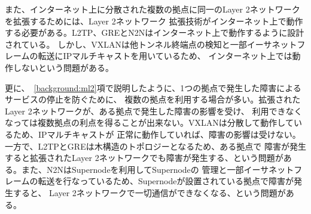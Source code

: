 また、インターネット上に分散された複数の拠点に同一のLayer 2ネットワークを拡張するためには、Layer 2ネットワーク
拡張技術がインターネット上で動作する必要がある。L2TP、GREとN2Nはインターネット上で動作するように設計されている。
しかし、VXLANは他トンネル終端点の検知と一部イーサネットフレームの転送にIPマルチキャストを用いているため、
インターネット上では動作しないという問題がある。

更に、~\ref{background:ml2}項で説明したように、1つの拠点で発生した障害によるサービスの停止を防ぐために、
複数の拠点を利用する場合が多い。拡張されたLayer 2ネットワークが、ある拠点で発生した障害の影響を受け、
利用できなくなっては複数拠点の利点を得ることが出来ない。VXLANは分散して動作しているため、IPマルチキャストが
正常に動作していれば、障害の影響は受けない。一方で、L2TPとGREは木構造のトポロジーとなるため、ある拠点で
障害が発生すると拡張されたLayer 2ネットワークでも障害が発生する、という問題がある。また、N2NはSupernodeを利用してSupernodeの
管理と一部イーサネットフレームの転送を行なっているため、Supernodeが設置されている拠点で障害が発生すると、
Layer 2ネットワークで一切通信ができなくなる、という問題がある。


